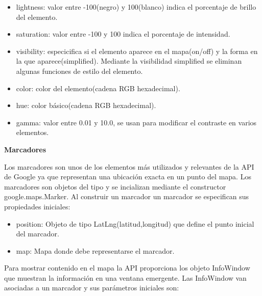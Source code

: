 \begin{itemize}

\item lightness: valor entre -100(negro) y 100(blanco) indica el porcentaje de brillo del elemento.

\item saturation: valor entre -100 y 100 indica el porcentaje de intensidad.

\item visibility: especicifica si el elemento aparece en el mapa(on/off) y la forma en la que aparece(simplified). Mediante la visibilidad simplified se eliminan algunas funciones de estilo del elemento.

\item color: color del elemento(cadena RGB hexadecimal).

\item hue: color básico(cadena RGB hexadecimal).

\item gamma: valor entre 0.01 y 10.0, se usan para modificar el contraste en varios elementos.

\end{itemize}

\vspace{5 mm}

\textbf{Marcadores}

Los marcadores son unos de los elementos más utilizados y relevantes de la API de Google ya que representan una ubicación exacta en un punto del mapa. Los marcadores son objetos del tipo  y se incializan mediante el constructor google.maps.Marker. Al construir un marcador un marcador se especifican sus propiedades iniciales:

\begin{itemize}

\item position: Objeto de tipo LatLng(latitud,longitud) que define el punto inicial del marcador.

\item map: Mapa donde debe representarse el marcador.

\end{itemize}

Para mostrar contenido en el mapa la API proporciona los objeto InfoWindow que muestran la información en una ventana emergente. Las InfoWindow van asociadas a un marcador y sus parámetros iniciales son:


